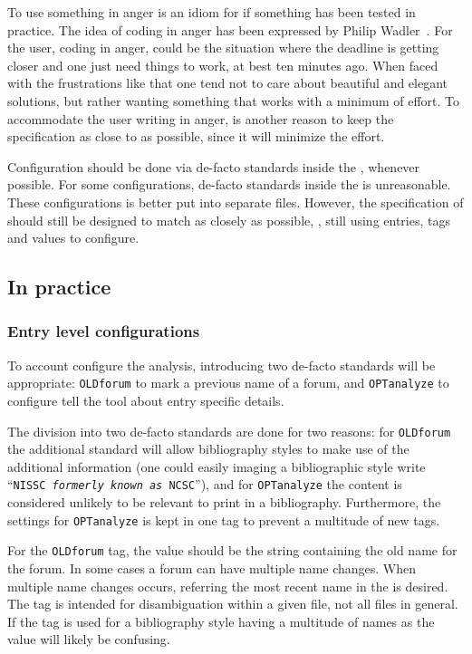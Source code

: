 To use something in anger is an idiom for if something has been tested
in practice.  The idea of coding in anger has been expressed by Philip
Wadler~\cite{wadler1997_functional}.  For the {\bibtex} user, coding
in anger, could be the situation where the deadline is getting closer
and one just need things to work, at best ten minutes ago.  When faced
with the frustrations like that one tend not to care about beautiful
and elegant solutions, but rather wanting something that works with a
minimum of effort.  To accommodate the user writing {\bibtex} in
anger, is another reason to keep the specification as close to
{\bibtex} as possible, since it will minimize the effort.

Configuration should be done via de-facto standards inside the
, whenever possible.  For some configurations, de-facto
standards inside the  is unreasonable.  These configurations
is better put into separate files.  However, the specification of
should still be designed to match {\bibtex} as closely as possible,
\ie, still using entries, tags and values to configure.


\subsection{In practice}
\label{sec:analyzing_in_practice}

\subsubsection{Entry level configurations}

To account configure the analysis, introducing two de-facto
standards will be appropriate: \texttt{OLDforum} to mark a previous
name of a forum, and \texttt{OPTanalyze} to configure tell the tool
about entry specific details.

The division into two de-facto standards are done for two reasons: for
\texttt{OLDforum} the additional standard will allow bibliography
styles to make use of the additional information (one could easily
imaging a bibliographic style write ``\texttt{NISSC \textit{formerly
    known as} NCSC}''), and for \texttt{OPTanalyze} the content is
considered unlikely to be relevant to print in a bibliography.
Furthermore, the settings for \texttt{OPTanalyze} is kept in one tag
to prevent a multitude of new tags.


For the \texttt{OLDforum} tag, the value should be the string
containing the old name for the forum.  In some cases a forum can have
multiple name changes.  When multiple name changes occurs, referring
the most recent name in the  is desired.  The tag is
intended for disambiguation within a given file, not all files in
general.  If the tag is used for a bibliography style having a
multitude of names as the value will likely be confusing.

